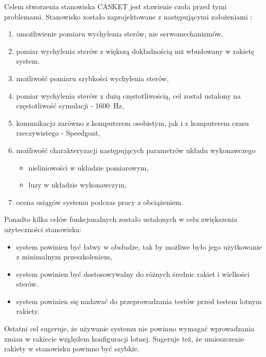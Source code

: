 Celem stworzenia stanowiska CASKET jest stawienie czoła przed tymi problemami. 
Stanowisko zostało zaprojektowane z następującymi założeniami \cite{ESAPAC2026_HIL}:
\begin{enumerate}
    \item umożliwienie pomiaru wychylenia sterów, nie serwomechanizmów,
    \item pomiar wychylenia sterów z większą dokładnością niż wbudowany w rakietę system.
    \item możliwość pomiaru szybkości wychylenia sterów,
    \item pomiar wychylenia sterów z dużą częstotliwością, cel został ustalony na częstotliwość symulacji - \SI{1600}{\hertz},
    \item komunikacja zarówno z komputerem osobistym, jak i z komputerem czasu rzeczywistego - Speedgoat,
    \item możliwość charakteryzacji następujących parametrów układu wykonawczego \begin{itemize}
        \item nieliniowości w układzie pomiarowym,
        \item luzy w układzie wykonawczym,
    \end{itemize}
    \item ocena osiągów systemu podczas pracy z obciążeniem.
\end{enumerate}
Ponadto kilka celów funkcjonalnych zostało ustalonych w celu zwiększenia użyteczności stanowiska:
\begin{itemize}
    \item system powinien być łatwy w obsłudze, tak by możliwe było jego użytkowanie z minimalnym przeszkoleniem,
    \item system powinien być dostosowywalny do różnych średnic rakiet i wielkości sterów.
    \item system powinien się nadawać do przeprowadzania testów przed testem lotnym rakiety.
\end{itemize}

Ostatni cel sugeruje, że używanie systemu nie powinno wymagać wprowadzania zmian w rakiecie względem konfiguracji lotnej. 
Sugeruje też, że umieszczenie rakiety w stanowisku powinno być szybkie.


